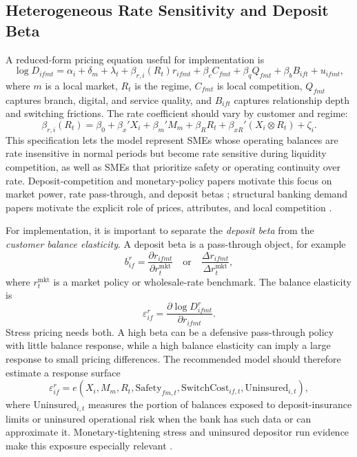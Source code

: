 \documentclass[11pt]{article}
\begin{document}
\subsection{Heterogeneous Rate Sensitivity and Deposit Beta}

A reduced-form pricing equation useful for implementation is
\[
  \log D_{ifmt}
  =
  \alpha_i+\delta_m+\lambda_t
  +\beta_{r,i}(R_t) r_{ifmt}
  +\beta_c C_{fmt}
  +\beta_q Q_{fmt}
  +\beta_b B_{ift}
  +u_{ifmt},
\]
where $m$ is a local market, $R_t$ is the regime, $C_{fmt}$ is local competition,
$Q_{fmt}$ captures branch, digital, and service quality, and $B_{ift}$ captures
relationship depth and switching frictions. The rate coefficient should vary by
customer and regime:
\[
  \beta_{r,i}(R_t)
  =
  \beta_0
  +\beta_x'X_i
  +\beta_m'M_m
  +\beta_R R_t
  +\beta_{xR}'(X_i\otimes R_t)
  +\zeta_i.
\]
This specification lets the model represent SMEs whose operating balances are
rate insensitive in normal periods but become rate sensitive during liquidity
competition, as well as SMEs that prioritize safety or operating continuity
over rate. Deposit-competition and monetary-policy papers motivate this focus
on market power, rate pass-through, and deposit betas
\citep{hannan1991rigidity,neumark1992market,egan2017deposit,drechsler2017deposits};
structural banking demand
papers motivate the explicit role of prices, attributes, and local competition
\citep{dick2008demand,adams2007who}.

For implementation, it is important to separate the \emph{deposit beta} from
the \emph{customer balance elasticity}. A deposit beta is a pass-through object,
for example
\[
  b_{if}^{r}
  =
  \frac{\partial r_{ifmt}}{\partial r_{t}^{\mathrm{mkt}}}
  \quad\text{or}\quad
  \frac{\Delta r_{ifmt}}{\Delta r_{t}^{\mathrm{mkt}}},
\]
where $r_t^{\mathrm{mkt}}$ is a market policy or wholesale-rate benchmark. The
balance elasticity is
\[
  \varepsilon_{if}^{r}
  =
  \frac{\partial \log D_{ifmt}^{r}}{\partial r_{ifmt}}.
\]
Stress pricing needs both. A high beta can be a defensive pass-through policy
with little balance response, while a high balance elasticity can imply a large
response to small pricing differences. The recommended model should therefore
estimate a response surface
\[
  \varepsilon_{if}^{r}
  =
  e(X_i,M_m,R_t,\mathrm{Safety}_{fm,t},
  \mathrm{SwitchCost}_{if,t},\mathrm{Uninsured}_{i,t}),
\]
where $\mathrm{Uninsured}_{i,t}$ measures the portion of balances exposed to
deposit-insurance limits or uninsured operational risk when the bank has such
data or can approximate it. Monetary-tightening stress and uninsured depositor
run evidence make this exposure especially relevant
\citep{jiang2023monetary}.
\end{document}
